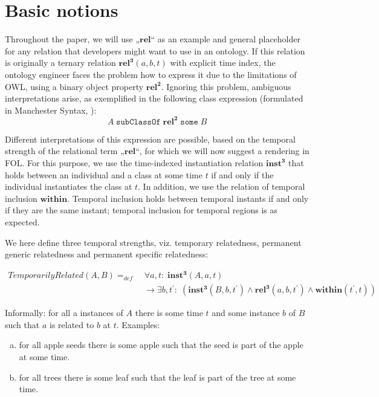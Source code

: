 \documentclass{ao2e}
\newcommand{\mirel}[1]{\ensuremath{\mathrm{\mathbf{#1}}}}
\newcommand{\mclass}[1]{\ensuremath{\mathit{#1}}}
\newcommand{\mrel}[2]{\mirel{#1^#2}}
\newcommand{\mrelb}[1]{\mrel{#1}{2}}
\newcommand{\mrelt}[1]{\mrel{#1}{3}}
\begin{document}
\section{Basic notions}
Throughout the paper, we will use „\mirel{rel}“ as an example and general placeholder
for any relation that developers might want to use in an ontology. If this
relation is originally a ternary relation $\mrelt{rel}(a, b, t)$ with explicit time
index, the ontology engineer faces the problem how to express it due to the
limitations of OWL, using a binary object property \mrelb{rel}. Ignoring this problem,
ambiguous interpretations arise, as exemplified in the following class
expression (formulated in Manchester Syntax, \cite{Man:Syntax}):
\begin{equation}
\mclass{A}\; \mathtt{subClassOf}\; \mrelb{rel}\; \mathtt{some}\; \mclass{B}
\end{equation}

Different interpretations of this expression are possible, based on the temporal
strength of the relational term „\mirel{rel}“, for which we will now suggest a
rendering in FOL. For this purpose, we use the time-indexed instantiation
relation \mrelt{inst} that holds between an individual and a class at some time
$t$ if
and only if the individual instantiates the class at $t$. In addition, we use the
relation of temporal inclusion \mirel{within}. Temporal inclusion holds between
temporal instants if and only if they are the same instant; temporal inclusion
for temporal regions is as expected.


We here define three temporal strengths, viz. temporary relatedness, permanent
generic relatedness and permanent specific relatedness:

\begin{equation}
\begin{split}
\mclass{TemporarilyRelated}(\mclass{A},\mclass{B}) =_{def}&\;
\forall a, t:\; \mrelt{inst}(\mclass{A}, a, t) \\
&\ \rightarrow
\exists b, t^\prime:\;(\mrelt{inst}(\mclass{B},b,t^\prime) \wedge
\mrelt{rel}(a,b,t^\prime) \wedge \mirel{within}(t^\prime,t))
\end{split}
\label{eq:temporarily}
\end{equation}


Informally: for all a instances of \mclass{A} there is some time $t$ and some instance $b$ of
\mclass{B} such that $a$ is related to $b$ at $t$. Examples: 
\begin{enumerate}[(a)]
\item for all apple seeds there is
some apple such that the seed is part of the apple at some time. 
\item for all
trees there is some leaf such that the leaf is part of the tree at some time.
\end{enumerate}
\end{document}
